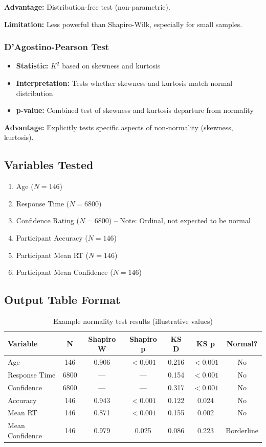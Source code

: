 \documentclass[12pt,a4paper]{article}
\begin{document}
\textbf{Advantage:} Distribution-free test (non-parametric).

\textbf{Limitation:} Less powerful than Shapiro-Wilk, especially for small samples.

\subsubsection{D'Agostino-Pearson Test}
\begin{itemize}
    \item \textbf{Statistic:} $K^2$ based on skewness and kurtosis
    \item \textbf{Interpretation:} Tests whether skewness and kurtosis match normal distribution
    \item \textbf{p-value:} Combined test of skewness and kurtosis departure from normality
\end{itemize}

\textbf{Advantage:} Explicitly tests specific aspects of non-normality (skewness, kurtosis).

\subsection{Variables Tested}

\begin{enumerate}
    \item Age ($N=146$)
    \item Response Time ($N=6800$)
    \item Confidence Rating ($N=6800$) -- Note: Ordinal, not expected to be normal
    \item Participant Accuracy ($N=146$)
    \item Participant Mean RT ($N=146$)
    \item Participant Mean Confidence ($N=146$)
\end{enumerate}

\subsection{Output Table Format}

\begin{table}[H]
\centering
\begin{tabular}{lcccccc}
\toprule
\textbf{Variable} & \textbf{N} & \textbf{Shapiro W} & \textbf{Shapiro p} & \textbf{KS D} & \textbf{KS p} & \textbf{Normal?} \\
\midrule
Age & 146 & 0.906 & $<0.001$ & 0.216 & $<0.001$ & No \\
Response Time & 6800 & --- & --- & 0.154 & $<0.001$ & No \\
Confidence & 6800 & --- & --- & 0.317 & $<0.001$ & No \\
Accuracy & 146 & 0.943 & $<0.001$ & 0.122 & 0.024 & No \\
Mean RT & 146 & 0.871 & $<0.001$ & 0.155 & 0.002 & No \\
Mean Confidence & 146 & 0.979 & 0.025 & 0.086 & 0.223 & Borderline \\
\bottomrule
\end{tabular}
\caption{Example normality test results (illustrative values)}
\end{table}
\end{document}
